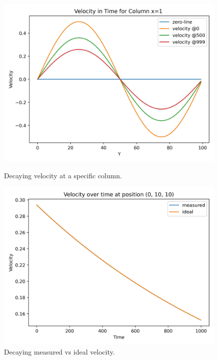 \begin{center}
    \begin{figure}[H]
        \begin{minipage}{0.5\textwidth}
            \includegraphics[width=\linewidth]{graphs/ShearWaveDecay/VelocityDistribution/velocity_at_column_x}
            \caption{Decaying velocity at a specific column.}
            \label{fig:swd-vs-at-column_x}
        \end{minipage}%
        \begin{minipage}{0.5\textwidth}
            \includegraphics[width=\linewidth]{graphs/ShearWaveDecay/VelocityDistribution/velocity_against_ideal}
            \caption{Decaying measured vs ideal velocity.}
            \label{fig:swd-vs-ideal}
        \end{minipage}
    \end{figure}
\end{center}

